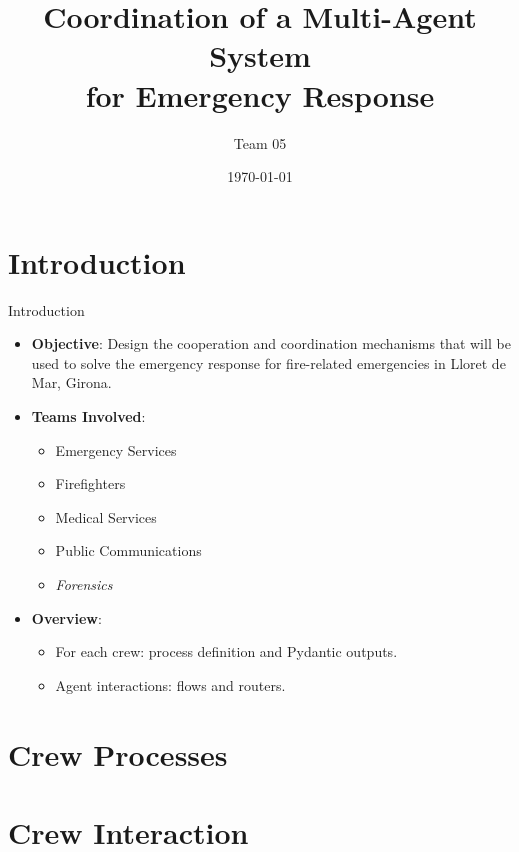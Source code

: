 \documentclass{beamer}
\title{Coordination of a Multi-Agent System \\for Emergency Response}
\author{Team 05}
\date{\today}
\begin{document}
\begin{frame}
    \titlepage
\end{frame}

\section{Introduction}
\begin{frame}{Introduction}
    \begin{itemize}
        \item \textbf{Objective}: Design the cooperation and coordination mechanisms that will
        be used to solve the emergency response for fire-related emergencies in Lloret de Mar, Girona.
        \item \textbf{Teams Involved}:
            \begin{itemize}
                \item Emergency Services
                \item Firefighters
                \item Medical Services
                \item Public Communications
                \item \textit{Forensics}
            \end{itemize}
        \item \textbf{Overview}:
            \begin{itemize}
                \item For each crew: process definition and Pydantic outputs. 
                \item Agent interactions: flows and routers.
            \end{itemize}
    \end{itemize}
\end{frame}

\section{Crew Processes}




\section{Crew Interaction}

\end{document}
